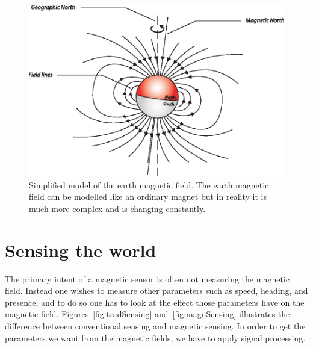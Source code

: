 \begin{figure}[!pbth]
 \centering
  \begin{minipage}{0.6\linewidth}
  \centering
   \includegraphics[width=1\linewidth]{images/earthmagnetic}
  \caption[Simplified model of the earth magnetic field]{Simplified model of the earth magnetic field. The earth magnetic field can be modelled like an ordinary magnet but in reality it is much more complex and is changing constantly.}
  \label{fig-earthmagnetic}
  \end{minipage}\hfill
\end{figure}

\section{Sensing the world}

The primary intent of a magnetic sensor is often not measuring the magnetic field. Instead one wishes to measure other parameters such as speed, heading, and presence, and to do so one has to look at the effect those parameters have on the magnetic field. Figures~\ref{fig:tradSensing} and~\ref{fig:magnSensing} illustrates the difference between conventional sensing and magnetic sensing. In order to get the parameters we want from the magnetic fields, we have to apply signal processing.


